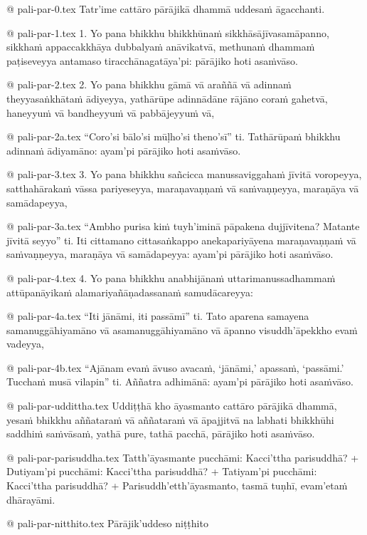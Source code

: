 @ pali-par-0.tex
﻿Tatr’ime cattāro pārājikā dhammā uddesaṁ āgacchanti.

@ pali-par-1.tex
1. Yo pana bhikkhu bhikkhūnaṁ sikkhāsājīvasamāpanno, sikkhaṁ appaccakkhāya dubbalyaṁ anāvikatvā, methunaṁ dhammaṁ paṭiseveyya antamaso tiracchānagatāya’pi: pārājiko hoti asaṁvāso.

@ pali-par-2.tex
2. Yo pana bhikkhu gāmā vā araññā vā adinnaṁ theyyasaṅkhātaṁ ādiyeyya, yathārūpe adinnādāne rājāno coraṁ gahetvā, haneyyuṁ vā bandheyyuṁ vā pabbājeyyuṁ vā,

@ pali-par-2a.tex
“Coro’si bālo’si mūḷho’si theno’sī” ti. Tathārūpaṁ bhikkhu adinnaṁ ādiyamāno: ayam’pi pārājiko hoti asaṁvāso.

@ pali-par-3.tex
3. Yo pana bhikkhu sañcicca manussaviggahaṁ jīvitā voropeyya, satthahārakaṁ vāssa pariyeseyya, maraṇavaṇṇaṁ vā saṁvaṇṇeyya, maraṇāya vā samādapeyya,

@ pali-par-3a.tex
“Ambho purisa kiṁ tuyh’iminā pāpakena dujjīvitena? Matante jīvitā seyyo” ti. Iti cittamano cittasaṅkappo anekapariyāyena maraṇavaṇṇaṁ vā saṁvaṇṇeyya, maraṇāya vā samādapeyya: ayam’pi pārājiko hoti asaṁvāso.

@ pali-par-4.tex
4. Yo pana bhikkhu anabhijānaṁ uttarimanussadhammaṁ attūpanāyikaṁ alamariyañāṇadassanaṁ samudācareyya:

@ pali-par-4a.tex
“Iti jānāmi, iti passāmī” ti. Tato aparena samayena samanuggāhiyamāno vā asamanuggāhiyamāno vā āpanno visuddh’āpekkho evaṁ vadeyya, 

@ pali-par-4b.tex
“Ajānam evaṁ āvuso avacaṁ, ‘jānāmi,’ apassaṁ, ‘passāmi.’ Tucchaṁ musā vilapin” ti. Aññatra adhimānā: ayam’pi pārājiko hoti asaṁvāso.

@ pali-par-uddittha.tex
Uddiṭṭhā kho āyasmanto cattāro pārājikā dhammā, yesaṁ bhikkhu aññataraṁ vā aññataraṁ vā āpajjitvā na labhati bhikkhūhi saddhiṁ saṁvāsaṁ, yathā pure, tathā pacchā, pārājiko hoti asaṁvāso.

@ pali-par-parisuddha.tex
Tatth’āyasmante pucchāmi: Kacci’ttha parisuddhā? +
Dutiyam’pi pucchāmi: Kacci’ttha parisuddhā? +
Tatiyam’pi pucchāmi: Kacci’ttha parisuddhā? +
Parisuddh’etth’āyasmanto, tasmā tuṇhī, evam’etaṁ dhārayāmi.

@ pali-par-nitthito.tex
Pārājik’uddeso niṭṭhito
